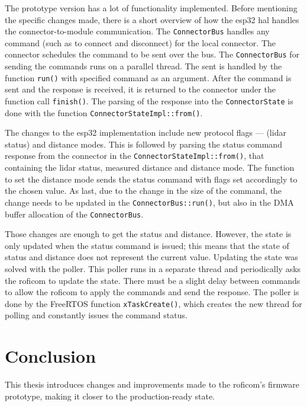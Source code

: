 \documentclass[
  digital,     %
  oneside,     %
  nosansbold,  %
  nocolorbold, %
  nolof,         %
  nolot,         %
]{fithesis4}
\begin{document}
{{{The prototype version has a lot of functionality implemented. Before mentioning the specific changes made, there is a short overview of how the esp32 \acrshort{hal} handles the connector-to-module communication. The \lstinline|ConnectorBus| handles any command (such as to connect and disconnect) for the local connector. The connector schedules the command to be sent over the bus. The \lstinline|ConnectorBus| for sending the commands runs on a parallel thread. The sent is handled by the function \lstinline|run()| with specified command as an argument. After the command is sent and the response is received, it is returned to the connector under the function call \lstinline|finish()|. The parsing of the response into the \lstinline|ConnectorState| is done with the function \lstinline|ConnectorStateImpl::from()|.

The changes to the esp32 implementation include new protocol flags --- (\acrshort{lidar} status) and distance modes. This is followed by parsing the status command response from the connector in the \lstinline|ConnectorStateImpl::from()|, that containing the \acrshort{lidar} status, measured distance and distance mode. The function to set the distance mode sends the status command with flags set accordingly to the chosen value. As last, due to the change in the size of the command, the change needs to be updated in the \lstinline|ConnectorBus::run()|, but also in the DMA buffer allocation of the \lstinline|ConnectorBus|.

Those changes are enough to get the status and distance. However, the state is only updated when the status command is issued; this means that the state of status and distance does not represent the current value. Updating the state was solved with the poller. This poller runs in a separate thread and periodically asks the \acrshort{roficom} to update the state. There must be a slight delay between commands to allow the \acrshort{roficom} to apply the commands and send the response. The poller is done by the FreeRTOS function \lstinline|xTaskCreate()|, which creates the new thread for polling and constantly issues the command status.

\chapter{Conclusion}

This thesis introduces changes and improvements made to the \acrshort{roficom}'s firmware prototype, making it closer to the production-ready state.

}}}
\end{document}
